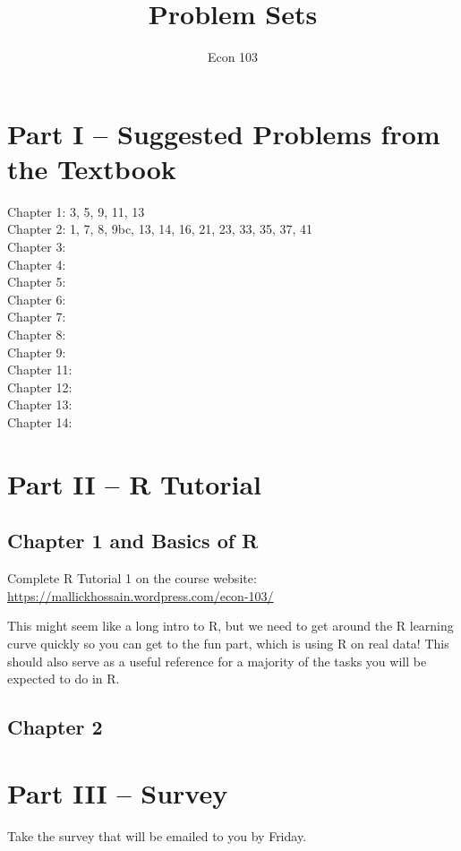 \documentclass[addpoints,12pt]{exam}
\title{Problem Sets}
\author{Econ 103}
\date{}
\begin{document}
\maketitle

\section*{Part I -- Suggested Problems from the Textbook}
Chapter 1: 3, 5, 9, 11, 13
\\
Chapter 2: 1, 7, 8, 9bc, 13, 14, 16, 21, 23, 33, 35, 37, 41
\\
Chapter 3: 
\\
Chapter 4: 
\\
Chapter 5:
\\
Chapter 6:
\\
Chapter 7:
\\
Chapter 8:
\\
Chapter 9:
\\
Chapter 11:
\\
Chapter 12:
\\
Chapter 13:
\\
Chapter 14:

 \section*{Part II -- R Tutorial}
 \subsection*{Chapter 1 and Basics of R}
Complete R Tutorial 1 on the course website:
\\
\url{https://mallickhossain.wordpress.com/econ-103/}

This might seem like a long intro to R, but we need to get around the R learning curve quickly so you can get to the fun part, which is using R on real data! This should also serve as a useful reference for a majority of the tasks you will be expected to do in R.

\subsection*{Chapter 2}

\section*{Part III -- Survey}
Take the survey that will be emailed to you by Friday.
\end{document}
